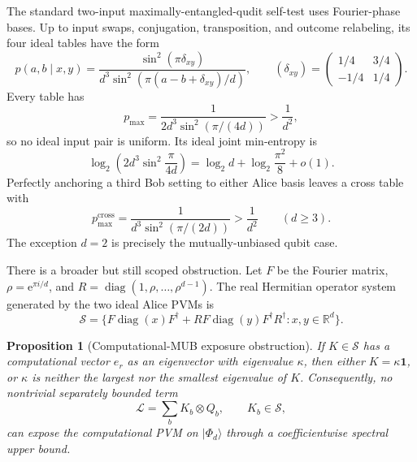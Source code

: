 \documentclass[11pt]{article}
\newtheorem{proposition}[theorem]{Proposition}
\theoremstyle{definition}
\theoremstyle{remark}
\newcommand{\Id}{\mathbf 1}
\newcommand{\e}{\mathrm e}
\begin{document}
The standard two-input maximally-entangled-qudit self-test
\cite{SarkarEtAl2021} uses Fourier-phase bases.  Up to input swaps,
conjugation, transposition, and outcome relabeling, its four ideal tables have
the form
\begin{equation}
 p(a,b\mid x,y)
 =\frac{\sin^2(\pi\delta_{xy})}
 {d^3\sin^2(\pi(a-b+\delta_{xy})/d)},
 \qquad
 (\delta_{xy})=
 \begin{pmatrix}1/4&3/4\\-1/4&1/4\end{pmatrix}.
 \label{eq:standard-tables}
\end{equation}
Every table has
\[
 p_{\max}=\frac1{2d^3\sin^2(\pi/(4d))}>\frac1{d^2},
\]
so no ideal input pair is uniform.  Its ideal joint min-entropy is
\[
 \log_2\!\left(2d^3\sin^2\frac{\pi}{4d}\right)
 =\log_2d+\log_2\frac{\pi^2}{8}+o(1).
\]
Perfectly anchoring a third Bob setting
to either Alice basis leaves a cross table with
\[
 p_{\max}^{\mathrm{cross}}
 =\frac1{d^3\sin^2(\pi/(2d))}>\frac1{d^2}
 \qquad(d\geq3).
\]
The exception \(d=2\) is precisely the mutually-unbiased qubit case.

There is a broader but still scoped obstruction.  Let \(F\) be the Fourier
matrix, \(\rho=\e^{\pi i/d}\), and
\(R=\operatorname{diag}(1,\rho,\ldots,\rho^{d-1})\).  The real Hermitian
operator system generated by the two ideal Alice PVMs is
\[
 \mathcal S=\{F\operatorname{diag}(x)F^\dagger
 +RF\operatorname{diag}(y)F^\dagger R^\dagger:x,y\in\mathbb R^d\}.
\]

\begin{proposition}[Computational-MUB exposure obstruction]
\label{prop:mub}
If \(K\in\mathcal S\) has a computational vector \(e_r\) as an eigenvector
with eigenvalue \(\kappa\), then either \(K=\kappa\Id\), or \(\kappa\) is
neither the largest nor the smallest eigenvalue of \(K\).  Consequently, no
nontrivial separately bounded term
\[
 \mathcal L=\sum_bK_b\otimes Q_b,
 \qquad K_b\in\mathcal S,
\]
can expose the computational PVM on \(\lvert\Phi_d\rangle\) through a
coefficientwise spectral upper bound.
\end{proposition}
\end{document}
